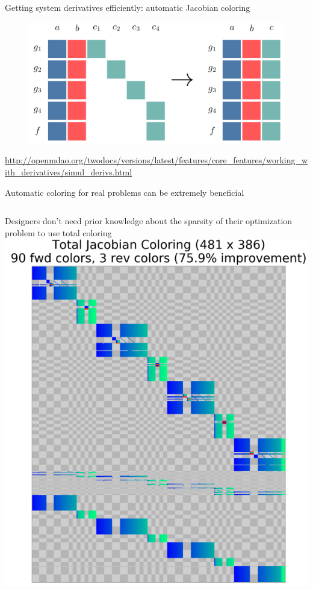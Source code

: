 \documentclass[aspectratio=169, usenames, dvipsnames, 14pt]{beamer}
\begin{document}
\begin{frame}{Getting system derivatives efficiently: automatic Jacobian coloring}
	\begin{figure}
		\includegraphics[scale=0.35]{images/slide_120.png}
	\end{figure}
	\url{http://openmdao.org/twodocs/versions/latest/features/core_features/working_with_derivatives/simul_derivs.html}
\end{frame} 

\begin{frame}{Automatic coloring for real problems can be extremely beneficial}

	\begin{columns}
			Designers don't need prior knowledge about the sparsity of their optimization problem to use total coloring
			\includegraphics[scale=.37]{images/slide_55_derivatives.png}
	\end{columns}
\end{frame}
\end{document}
